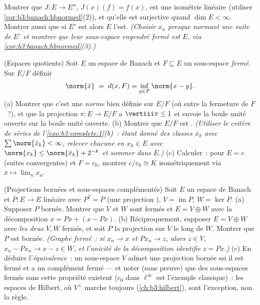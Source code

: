 \begin{exercise}[$\star\star$]\label{exo:b3:banach:10}
Montrer que $J \colon E \to E''$, $J(x)(f) = f(x)$, est une
isométrie linéaire (utiliser
\cref{cor:b3:banach:hbnormed}(2)), et qu'elle est surjective
quand $\dim E < \infty$. Montrer aussi que si $E'$ est
 alors $E$ l'est. \emph{(Choisir $x_n$ presque
normant une suite  de $E'$ et montrer que leur
sous-espace engendré fermé est $E$, via
\cref{cor:b3:banach:hbnormed}(3).)}
\end{exercise}

\begin{exercise}[$\star\star$]\label{exo:b3:banach:11}
(Espaces quotients) Soit $E$ un espace de Banach et $F
\subseteq E$ un sous-espace \emph{fermé}. Sur $E/F$ définir
\[
\norm{\bar x} \;=\; d(x, F) = \inf_{y\in F}\norm{x - y} .
\]
(a) Montrer que c'est une \emph{norme} bien définie sur $E/F$
(où entre la fermeture de $F$~?), et que la projection $\pi
\colon E \to E/F$ a $\vertiii\pi \leq 1$ et envoie la boule
unité ouverte sur la boule unité ouverte.
(b) Montrer que $E/F$ est . \emph{(Utiliser le critère
de séries de l'\cref{exo:b3:complete:1}(b)~: étant donné des
classes $\bar x_k$ avec $\sum\norm{\bar x_k} < \infty$,
relever chacune en $x_k \in E$ avec $\norm{x_k} \leq
\norm{\bar x_k} + 2^{-k}$ et sommer dans $E$.)}
(c) Calculer~: pour $E = c$ (suites convergentes) et $F =
c_0$, montrer $c/c_0 \cong K$ isométriquement via $\bar x
\mapsto \lim_nx_n$.
\end{exercise}

\begin{exercise}[$\star\star$]\label{exo:b3:banach:12}
(Projections bornées et sous-espaces complémentés) Soit $E$ un
espace de Banach et $P \colon E \to E$ linéaire avec $P^2 =
P$ (une projection ), $V = \operatorname{im}P$, $W
= \ker P$.
(a) Supposer $P$ bornée. Montrer que $V$ et $W$ sont fermés et
$E = V \oplus W$ avec la décomposition $x = Px + (x - Px)$.
(b) Réciproquement, supposer $E = V \oplus W$ avec
\emph{les deux} $V, W$ fermés, et soit $P$ la projection sur
$V$ le long de $W$. Montrer que $P$ est bornée.
\emph{(Graphe fermé~: si $x_n \to x$ et $Px_n \to z$, alors
$z \in V$, $x_n - Px_n \to x - z \in W$, et l'unicité de la
décomposition identifie $z = Px$.)}
(c) En déduire l'\emph{équivalence}~: un sous-espace $V$
admet une projection bornée ssi il est fermé et a un
complément  fermé --- et noter (sans preuve) que des
sous-espaces fermés sans cette propriété existent ($c_0$ dans
$\ell^\infty$ est l'exemple classique)~: les espaces de
Hilbert, où $V^\perp$ marche toujours
(\cref{ch:b3:hilbert}), sont l'exception, non la règle.
\end{exercise}

